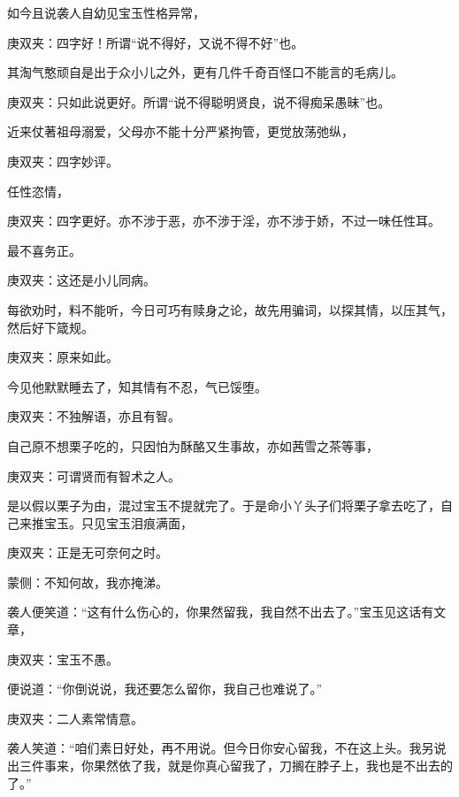 \begin{parag}
    如今且说袭人自幼见宝玉性格异常，\begin{note}庚双夹：四字好！所谓“说不得好，又说不得不好”也。\end{note}其淘气憨顽自是出于众小儿之外，更有几件千奇百怪口不能言的毛病儿。\begin{note}庚双夹：只如此说更好。所谓“说不得聪明贤良，说不得痴呆愚昧”也。\end{note}近来仗著祖母溺爱，父母亦不能十分严紧拘管，更觉放荡弛纵，\begin{note}庚双夹：四字妙评。\end{note}任性恣情，\begin{note}庚双夹：四字更好。亦不涉于恶，亦不涉于淫，亦不涉于娇，不过一味任性耳。\end{note}最不喜务正。\begin{note}庚双夹：这还是小儿同病。\end{note}每欲劝时，料不能听，今日可巧有赎身之论，故先用骗词，以探其情，以压其气，然后好下箴规。\begin{note}庚双夹：原来如此。\end{note}今见他默默睡去了，知其情有不忍，气已馁堕。\begin{note}庚双夹：不独解语，亦且有智。\end{note}自己原不想栗子吃的，只因怕为酥酪又生事故，亦如茜雪之茶等事，\begin{note}庚双夹：可谓贤而有智术之人。\end{note}是以假以栗子为由，混过宝玉不提就完了。于是命小丫头子们将栗子拿去吃了，自己来推宝玉。只见宝玉泪痕满面，\begin{note}庚双夹：正是无可奈何之时。\end{note}\begin{note}蒙侧：不知何故，我亦掩涕。\end{note}袭人便笑道：“这有什么伤心的，你果然留我，我自然不出去了。”宝玉见这话有文章，\begin{note}庚双夹：宝玉不愚。\end{note}便说道：“你倒说说，我还要怎么留你，我自己也难说了。”\begin{note}庚双夹：二人素常情意。\end{note}袭人笑道：“咱们素日好处，再不用说。但今日你安心留我，不在这上头。我另说出三件事来，你果然依了我，就是你真心留我了，刀搁在脖子上，我也是不出去的了。”
\end{parag}


